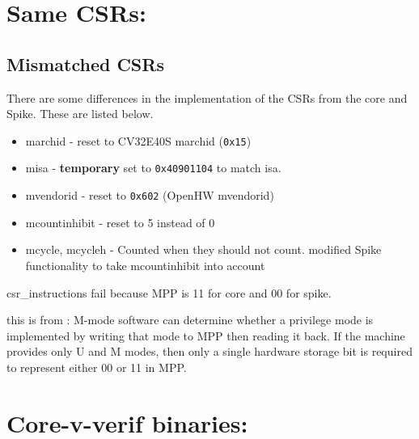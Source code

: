 
\section{Same CSRs: }

\subsection{Mismatched CSRs}

There are some differences in the implementation of the CSRs from the core and Spike. These are listed below.

\begin{itemize}
    \item marchid - reset to CV32E40S marchid (\lstinline{0x15})
    \item misa - \textbf{temporary} set to \lstinline{0x40901104} to match isa. 
    \item mvendorid  - reset to \lstinline{0x602} (OpenHW mvendorid)
    \item mcountinhibit - reset to 5 instead of 0
    \item mcycle, mcycleh - Counted when they should not count. modified Spike functionality to take mcountinhibit into account
\end{itemize}

csr\_instructions fail because MPP is 11 for core and 00 for spike. 

this is from \cite{watermanRISCVInstructionSet2021}:
M-mode software can determine whether a privilege mode is implemented by writing that mode
to MPP then reading it back.
If the machine provides only U and M modes, then only a single hardware storage bit is
required to represent either 00 or 11 in MPP.



\section{Core-v-verif binaries: }

%

%
%
%
%
%




